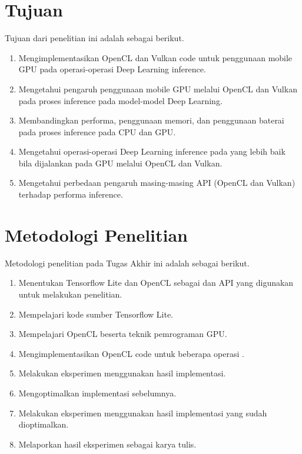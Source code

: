 \section{Tujuan}
Tujuan dari penelitian ini adalah sebagai berikut.
\begin{enumerate}
\item Mengimplementasikan OpenCL dan Vulkan code untuk penggunaan mobile GPU pada operasi-operasi Deep Learning inference.
\item Mengetahui pengaruh penggunaan mobile GPU melalui OpenCL dan Vulkan pada proses inference pada model-model Deep Learning.
\item Membandingkan performa, penggunaan memori, dan penggunaan baterai pada proses inference pada CPU dan GPU.
\item Mengetahui operasi-operasi Deep Learning inference pada yang lebih baik bila dijalankan pada GPU melalui OpenCL dan Vulkan.
\item Mengetahui perbedaan pengaruh masing-masing API (OpenCL dan Vulkan) terhadap performa inference.

\end{enumerate}



\section{Metodologi Penelitian}
Metodologi penelitian pada Tugas Akhir ini adalah sebagai berikut.
\begin{enumerate}
\item Menentukan Tensorflow Lite dan OpenCL sebagai \framework dan API yang digunakan untuk melakukan penelitian.
\item Mempelajari kode sumber Tensorflow Lite.
\item Mempelajari OpenCL beserta teknik pemrograman GPU.
\item Mengimplementasikan OpenCL code untuk beberapa operasi \deeplearning \inference.
\item Melakukan eksperimen menggunakan hasil implementasi.
\item Mengoptimalkan implementasi sebelumnya.
\item Melakukan eksperimen menggunakan hasil implementasi yang sudah dioptimalkan.
\item Melaporkan hasil eksperimen sebagai karya tulis.
\end{enumerate}

